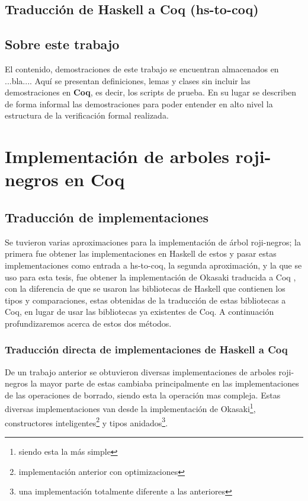 \documentclass[letterpaper,12pt,oneside]{book}
\newcommand{\coq}{\textbf{Coq}}
\newcommand{\arn}{árbol roji-negro}
\newcommand{\arns}{arboles roji-negros}
\theoremstyle{plain}
\theoremstyle{definition}
\theoremstyle{remark}
\begin{document}
\section{Traducción de Haskell a {\coq} (hs-to-coq)}

\section {Sobre este trabajo}
El contenido, demostraciones de este trabajo se encuentran almacenados en ...bla.... Aqu\'i se presentan 
definiciones, lemas y clases sin incluir las demostraciones en {\coq}, es decir, los scripts de prueba. En su 
lugar se describen de forma informal las demostraciones para poder entender en alto nivel la estructura de la 
verificaci\'on formal realizada.

\chapter{Implementación de arboles roji-negros en {\coq}}
\section{Traducción de implementaciones}
Se tuvieron varias aproximaciones para la implementación de {{{{\arn}}}s}; la primera fue obtener las implementaciones en
Haskell de estos\cite{tesisG} y pasar estas implementaciones como entrada a hs-to-coq, la 
segunda aproximación, y la que se uso para esta tesis, fue obtener la implementación de Okasaki traducida a Coq 
\cite{MSetRBT}, con la diferencia de que se usaron las bibliotecas de Haskell que contienen los tipos y
comparaciones, estas obtenidas de la traducción de estas bibliotecas a Coq, en lugar de usar las 
bibliotecas ya existentes de Coq.
A continuación profundizaremos acerca de estos dos métodos.
\subsection{Traducción directa de implementaciones de Haskell a Coq}
De un trabajo anterior\cite{tesisG} se obtuvieron diversas implementaciones de {\arns} la mayor parte de estas
cambiaba principalmente en las implementaciones de las operaciones de borrado, siendo esta la operación mas compleja. 
Estas diversas implementaciones van desde la implementación de Okasaki\footnote{siendo esta la m\'as simple}, constructores inteligentes\footnote{implementaci\'on anterior con optimizaciones} y tipos anidados\footnote{una implementaci\'on totalmente diferente a las anteriores}.
\end{document}
